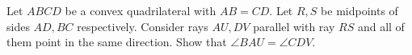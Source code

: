 Let $ABCD$ be a convex quadrilateral with $AB=CD$. Let $R,S$ be midpoints of sides $AD,BC$ respectively. Consider rays $AU, DV$ parallel with ray $RS$ and all of them point in the same direction. Show that $\angle BAU=\angle CDV$.